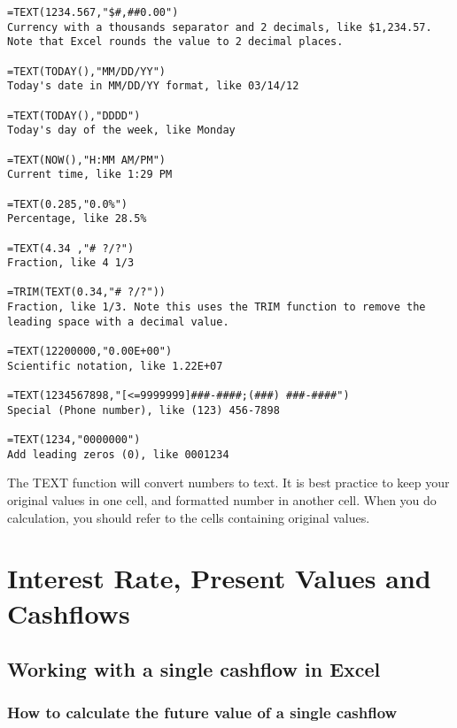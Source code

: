 \documentclass[
]{article}
\theoremstyle{definition}
\theoremstyle{definition}
\theoremstyle{definition}
\theoremstyle{definition}
\theoremstyle{remark}
\begin{document}
\begin{verbatim}
=TEXT(1234.567,"$#,##0.00")     
Currency with a thousands separator and 2 decimals, like $1,234.57. Note that Excel rounds the value to 2 decimal places.

=TEXT(TODAY(),"MM/DD/YY")
Today's date in MM/DD/YY format, like 03/14/12

=TEXT(TODAY(),"DDDD")
Today's day of the week, like Monday

=TEXT(NOW(),"H:MM AM/PM")
Current time, like 1:29 PM

=TEXT(0.285,"0.0%")
Percentage, like 28.5%

=TEXT(4.34 ,"# ?/?")
Fraction, like 4 1/3

=TRIM(TEXT(0.34,"# ?/?"))
Fraction, like 1/3. Note this uses the TRIM function to remove the leading space with a decimal value.

=TEXT(12200000,"0.00E+00")
Scientific notation, like 1.22E+07

=TEXT(1234567898,"[<=9999999]###-####;(###) ###-####")
Special (Phone number), like (123) 456-7898

=TEXT(1234,"0000000")
Add leading zeros (0), like 0001234
\end{verbatim}

The TEXT function will convert numbers to text. It is best practice to
keep your original values in one cell, and formatted number in another
cell. When you do calculation, you should refer to the cells containing
original values.

\hypertarget{interest-rate-present-values-and-cashflows}{%
\section{Interest Rate, Present Values and Cashflows}\label{interest-rate-present-values-and-cashflows}}

\hypertarget{working-with-a-single-cashflow-in-excel}{%
\subsection{Working with a single cashflow in Excel}\label{working-with-a-single-cashflow-in-excel}}

\hypertarget{how-to-calculate-the-future-value-of-a-single-cashflow}{%
\subsubsection{How to calculate the future value of a single cashflow}\label{how-to-calculate-the-future-value-of-a-single-cashflow}}
\end{document}
